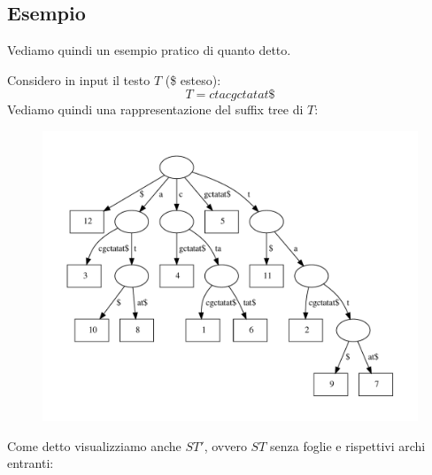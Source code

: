 \documentclass[a4paper,12pt, oneside]{book}
\begin{document}
\subsection{Esempio}
Vediamo quindi un esempio pratico di quanto detto.
\begin{esempio}
  Considero in input il testo $T$ (\$ esteso):
  \[T=ctacgctatat\$\]
  \newpage
  Vediamo quindi una rappresentazione del suffix tree di $T$:
  \begin{figure}[H]
    \centering
    \includegraphics[scale = 0.6]{img/ass3.pdf}
  \end{figure}
  Come detto visualizziamo anche $ST'$, ovvero $ST$ senza foglie e rispettivi
  archi entranti:
  \begin{figure}[H]
    \centering

\end{figure}
\end{esempio}
\end{document}
